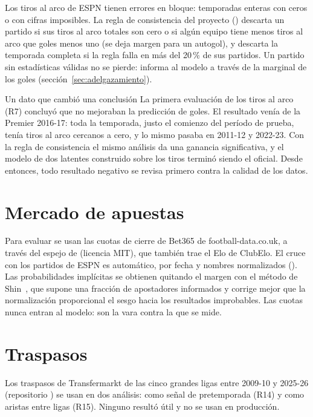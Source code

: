 Los tiros al arco de ESPN tienen errores en bloque: temporadas enteras con ceros o con cifras imposibles. La regla de consistencia del proyecto () descarta un partido si sus tiros al arco totales son cero o si algún equipo tiene menos tiros al arco que goles menos uno (se deja margen para un autogol), y descarta la temporada completa si la regla falla en más del 20\,\% de sus partidos. Un partido sin estadísticas válidas no se pierde: informa al modelo a través de la marginal de los goles (sección~\ref{sec:adelgazamiento}).

\begin{nota}{Un dato que cambió una conclusión}
La primera evaluación de los tiros al arco (R7) concluyó que no mejoraban la predicción de goles. El resultado venía de la Premier 2016-17: toda la temporada, justo el comienzo del período de prueba, tenía tiros al arco cercanos a cero, y lo mismo pasaba en 2011-12 y 2022-23. Con la regla de consistencia el mismo análisis da una ganancia significativa, y el modelo de dos latentes construido sobre los tiros terminó siendo el oficial. Desde entonces, todo resultado negativo se revisa primero contra la calidad de los datos.
\end{nota}

\section{Mercado de apuestas}

Para evaluar se usan las cuotas de cierre de Bet365 de football-data.co.uk, a través del espejo de  (licencia MIT), que también trae el Elo de ClubElo. El cruce con los partidos de ESPN es automático, por fecha y nombres normalizados (). Las probabilidades implícitas se obtienen quitando el margen con el método de Shin~\cite{shin1993}, que supone una fracción de apostadores informados y corrige mejor que la normalización proporcional el sesgo hacia los resultados improbables. Las cuotas nunca entran al modelo: son la vara contra la que se mide.

\section{Traspasos}

Los traspasos de Transfermarkt de las cinco grandes ligas entre 2009-10 y 2025-26 (repositorio ) se usan en dos análisis: como señal de pretemporada (R14) y como aristas entre ligas (R15). Ninguno resultó útil y no se usan en producción.

